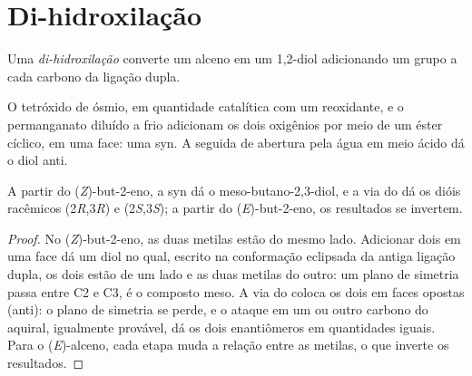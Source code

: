 \section{Di-hidroxilação}

\begin{definition}[Di-hidroxilação]\label{def:b2:alkene-redox:dihydroxylation}
Uma \emph{di-hidroxilação} converte um alceno em um
1,2-diol adicionando um grupo  a cada carbono da ligação dupla.
\end{definition}

O tetróxido de ósmio, em quantidade catalítica com um reoxidante, e o
permanganato diluído a frio adicionam os dois oxigênios por meio de um éster
cíclico, em uma face: uma  syn. A  seguida de
abertura pela água em meio ácido dá o diol anti.

\begin{proposition}\label{prop:b2:alkene-redox:diols}
A partir do (\textit{Z})-but-2-eno, a  syn dá o meso-butano-2,3-diol,
e a via do  dá os dióis racêmicos (2\textit{R},3\textit{R}) e
(2\textit{S},3\textit{S}); a partir do (\textit{E})-but-2-eno, os resultados se
invertem.
\end{proposition}

\begin{proof}
No (\textit{Z})-but-2-eno, as duas metilas estão do mesmo lado. Adicionar dois
 em uma face dá um diol no qual, escrito na conformação eclipsada da
antiga ligação dupla, os dois  estão de um lado e as duas metilas do
outro: um plano de simetria passa entre C2 e C3, é o composto meso. A via do
 coloca os dois  em faces opostas (anti): o plano de simetria se
perde, e o ataque em um ou outro carbono do  aquiral, igualmente
provável, dá os dois enantiômeros em quantidades iguais. Para o
(\textit{E})-alceno, cada etapa muda a relação entre as metilas, o que inverte
os resultados.
\end{proof}

